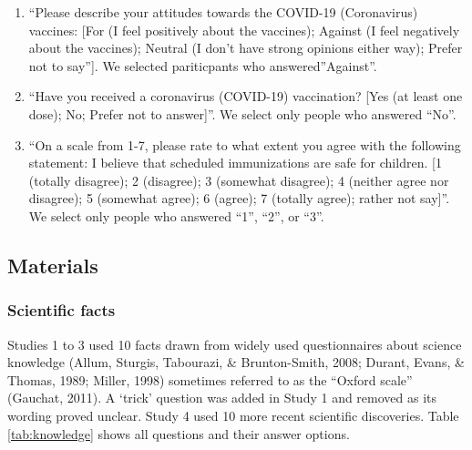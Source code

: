 \documentclass[
  doc,floatsintext]{apa6}
\providecommand{\tightlist}{%
  \setlength{\itemsep}{0pt}\setlength{\parskip}{0pt}}
\begin{document}
\begin{enumerate}
\def\labelenumi{\arabic{enumi}.}
\tightlist
\item
  ``Please describe your attitudes towards the COVID-19 (Coronavirus) vaccines: {[}For (I feel positively about the vaccines); Against (I feel negatively about the vaccines); Neutral (I don't have strong opinions either way); Prefer not to say''{]}. We selected pariticpants who answered''Against''.
\item
  ``Have you received a coronavirus (COVID-19) vaccination? {[}Yes (at least one dose); No; Prefer not to answer{]}''. We select only people who answered ``No''.
\item
  ``On a scale from 1-7, please rate to what extent you agree with the following statement: I believe that scheduled immunizations are safe for children. {[}1 (totally disagree); 2 (disagree); 3 (somewhat disagree); 4 (neither agree nor disagree); 5 (somewhat agree); 6 (agree); 7 (totally agree); rather not say{]}''. We select only people who answered ``1'', ``2'', or ``3''.
\end{enumerate}

\subsection{Materials}\label{materials-1}

\subsubsection{Scientific facts}\label{scientific-facts}

Studies 1 to 3 used 10 facts drawn from widely used questionnaires about science knowledge (Allum, Sturgis, Tabourazi, \& Brunton-Smith, 2008; Durant, Evans, \& Thomas, 1989; Miller, 1998) sometimes referred to as the ``Oxford scale'' (Gauchat, 2011). A `trick' question was added in Study 1 and removed as its wording proved unclear. Study 4 used 10 more recent scientific discoveries. Table \ref{tab:knowledge} shows all questions and their answer options.

\begingroup\fontsize{8}{10}\selectfont
\end{document}

